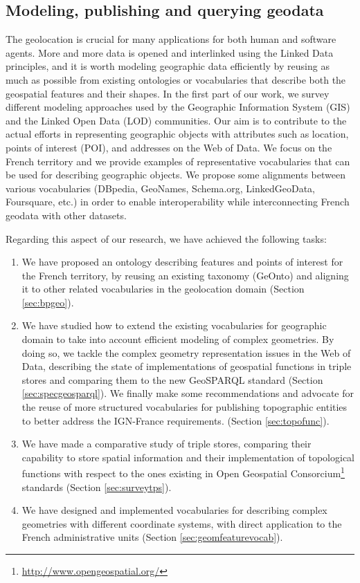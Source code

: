 \begin{enumerate}
\subsection{Modeling, publishing and querying geodata}
The geolocation is crucial for many applications for both human and software agents. More and more data is opened and interlinked using the Linked Data principles, and it is worth modeling geographic data efficiently by reusing as much as possible from existing ontologies or vocabularies that describe both the geospatial features and their shapes. In the first part of our work, we survey different modeling approaches used by the Geographic Information System (GIS) and the Linked Open Data (LOD) communities. Our aim is to contribute to the actual efforts in representing geographic objects with attributes such as location, points of interest (POI), and addresses on the Web of Data. We focus on the French territory and we provide examples of representative vocabularies that can be used for describing geographic objects. We propose some alignments between various vocabularies (DBpedia, GeoNames, Schema.org, LinkedGeoData, Foursquare, etc.) in order to enable interoperability while interconnecting French geodata with other datasets. 

Regarding this aspect of our research, we have achieved the following tasks:
 \begin{enumerate}
 
  \item We have proposed an ontology describing features and points of interest for the French territory, by reusing an existing taxonomy (GeOnto) and aligning it to other related vocabularies in the geolocation domain (Section \ref{sec:bpgeo}).
  \item  We have studied how to extend the existing vocabularies for geographic domain to take into account efficient modeling of complex geometries. By doing so, we tackle the complex geometry representation issues in the Web of Data, describing the state of implementations of geospatial functions in triple stores and comparing them to the new GeoSPARQL standard (Section \ref{sec:specgeosparql}).  We finally make some recommendations and advocate for the reuse of more structured vocabularies for publishing topographic entities to better address the IGN-France requirements. (Section \ref{sec:topofunc}).
  
 \item We have made a comparative study of triple stores, comparing their capability to store spatial information and their implementation of topological functions with respect to the ones 
existing in Open Geospatial Consorcium\footnote{\url{http://www.opengeospatial.org/}} standards (Section \ref{sec:surveytps}).
 \item  We have designed and implemented vocabularies for describing complex geometries with different coordinate systems, with direct application to the French administrative units (Section \ref{sec:geomfeaturevocab}).
 

\end{enumerate}
\end{enumerate}
